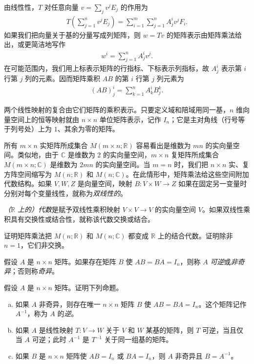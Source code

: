 \documentclass[../../main.tex]{subfiles}
\begin{document}
由线性性，$T$ 对任意向量 $v=\sum_j v^j E_j$ 的作用为
\begin{align*}
T\left(\sum_{j=1}^n v^j E_j\right)=\sum_{i=1}^m\sum_{j=1}^n A^i_j v^j F_i.
\end{align*}
如果我们把向量关于基的分量写成列矩阵，则 $w=Tv$ 的矩阵表示由矩阵乘法给出，或更简洁地写作
\begin{align*}
w^i=\sum_{j=1}^n A^i_j v^j.
\end{align*}
在可能范围内，我们用上标表示矩阵的行指标、下标表示列指标，故 $A^i_j$ 表示第 $i$ 行第 $j$ 列的元素。因而矩阵乘积 $AB$ 的第 $i$ 行第 $j$ 列元素为
\begin{align*}
(AB)^i_j=\sum_{k=1}^n A^i_k B^k_j.
\end{align*}

两个线性映射的复合由它们矩阵的乘积表示。只要定义域和陪域用同一基，$n$ 维向量空间上的恒等映射就由 $n\times n$ 单位矩阵表示，记作 $I_n$；它是主对角线（行号等于列号处）上为 $1$、其余为零的矩阵。

所有 $m\times n$ 实矩阵所成集合 $M(m\times n;\mathbb R)$ 容易看出是维数为 $mn$ 的实向量空间。类似地，由于 $\mathbb C$ 是维数为 $2$ 的实向量空间，$m\times n$ 复矩阵所成集合 $M(m\times n;\mathbb C)$ 是维数为 $2mn$ 的实向量空间。当 $m=n$ 时，我们把 $n\times n$ 实、复方阵空间缩写为 $M(n;\mathbb R)$ 和 $M(n;\mathbb C)$。在此情形中，矩阵乘法给这些空间附加代数结构。如果 $V,W,Z$ 是向量空间，映射 $B:V\times W\to Z$ 如果在固定另一变量时分别对每个变量线性，就称为\emph{双线性的}。

\emph{（$\mathbb R$ 上的）代数}是赋予双线性乘积映射 $V\times V\to V$ 的实向量空间 $V$。如果双线性乘积具有交换性或结合性，就称该代数交换或结合。

\begin{exercise}\label{exercise:appB-B-18}
证明矩阵乘法把 $M(n;\mathbb R)$ 和 $M(n;\mathbb C)$ 都变成 $\mathbb R$ 上的结合代数。证明除非 $n=1$，它们非交换。
\end{exercise}

假设 $A$ 是 $n\times n$ 矩阵。如果存在矩阵 $B$ 使 $AB=BA=I_n$，则称 $A$ \emph{可逆}或\emph{非奇异}；否则称\emph{奇异}。

\begin{exercise}\label{exercise:appB-B-19}
假设 $A$ 是 $n\times n$ 矩阵。证明下列命题。
\begin{enumerate}[(a)]
\item 如果 $A$ 非奇异，则存在唯一 $n\times n$ 矩阵 $B$ 使 $AB=BA=I_n$。这个矩阵记作 $A^{-1}$，称为 $A$ 的\emph{逆}。
\item 如果 $A$ 是线性映射 $T:V\to W$ 关于 $V$ 和 $W$ 某基的矩阵，则 $T$ 可逆，当且仅当 $A$ 可逆；此时 $A^{-1}$ 是 $T^{-1}$ 关于同一组基的矩阵。
\item 如果 $B$ 是 $n\times n$ 矩阵使 $AB=I_n$ 或 $BA=I_n$，则 $A$ 非奇异且 $B=A^{-1}$。
\end{enumerate}
\end{exercise}
\end{document}
